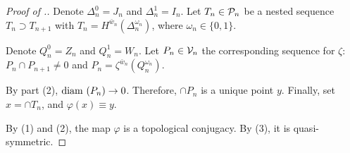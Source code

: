 \begin{proof}[Proof of .] Denote $\Delta_n^0=J_n$ and $\Delta_n^1=I_n$. Let $T_n \in \mathcal{P}_n$ be a nested sequence  $T_n\supset T_{n+1}$ with  $T_n=H^{\bar w_n}(\Delta_n^{\omega_n})$, where $\omega_n \in \{0,1\}$.
 
Denote $Q_n^0=Z_n$ and $Q_n^1=W_n$. Let $P_n \in \mathcal{V}_n$ the corresponding sequence for $\zeta$: $P_n \cap P_{n+1} \ne 0$ and $P_n=\zeta^{\bar w_n}(Q_n^{\omega_n})$. 

By  part (2),  ${\rm diam} { \ ( }P_n)\to 0$.
Therefore, $\cap P_n$ is a unique point $y$. Finally,  set $x=\cap T_n$, and $\varphi(x) \equiv y$. 

By  (1) and (2), the map $\varphi$ is a  topological conjugacy. By  (3), it is quasi-symmetric.
 \end{proof}



